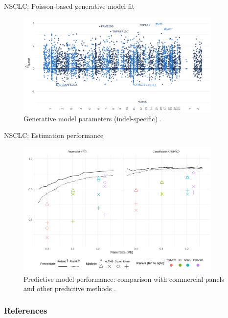 \documentclass{beamer}
\begin{document}
\begin{frame}{NSCLC: Poisson-based generative model fit}

\begin{figure}[htbp]
\centering
\includegraphics[width=4in]{figures/fig5.png}
\caption{Generative model parameters (indel-specific) \citep{bradley_data-driven_2021}. \label{fig:3}}
\end{figure}
    
\end{frame}

\begin{frame}{NSCLC: Estimation performance}

\begin{figure}[htbp]
\centering
\includegraphics[width=4in]{fig7.png}
\caption{Predictive model performance: comparison with commercial panels and other predictive methods \citep{bradley_data-driven_2021, yao_ectmb_2020}. \label{fig:7}}
\end{figure}
\end{frame}

\begin{frame}[allowframebreaks]
        \frametitle{References}
        
\end{frame}
\end{document}

